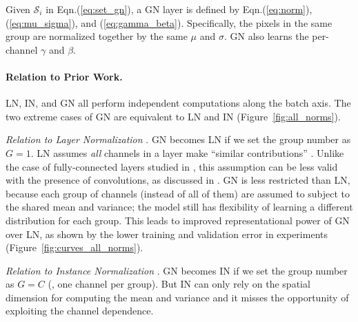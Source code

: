 \documentclass[10pt,twocolumn,letterpaper]{article}
\begin{document}
Given $\mathcal{S}_i$ in Eqn.(\ref{eq:set_gn}), a GN layer is defined by Eqn.(\ref{eq:norm}), (\ref{eq:mu_sigma}), and (\ref{eq:gamma_beta}). Specifically, the pixels in the same group are normalized together by the same $\mu$ and $\sigma$. GN also learns the per-channel $\gamma$ and $\beta$.


\paragraph{Relation to Prior Work.} LN, IN, and GN all perform independent computations along the batch axis.
The two extreme cases of GN are equivalent to LN and IN (Figure~\ref{fig:all_norms}).

\vspace{.5em}\noindent
\emph{Relation to Layer Normalization} \cite{Ba2016}. GN becomes LN if we set the group number as $G=1$. LN assumes \emph{all} channels in a layer make ``similar contributions'' \cite{Ba2016}. Unlike the case of fully-connected layers studied in \cite{Ba2016}, this assumption can be less valid with the presence of convolutions, as discussed in \cite{Ba2016}. GN is less restricted than LN, because each group of channels (instead of all of them) are assumed to subject to the shared mean and variance; the model still has flexibility of learning a different distribution for each group. This leads to improved representational power of GN over LN, as shown by the lower training and validation error in experiments (Figure~\ref{fig:curves_all_norms}).

\vspace{.5em}\noindent
\emph{Relation to Instance Normalization} \cite{Ulyanov2016}. GN becomes IN if we set the group number as $G=C$ (\ie, one channel per group). But IN can only rely on the spatial dimension for computing the mean and variance and it misses the opportunity of exploiting the channel dependence.
\end{document}
